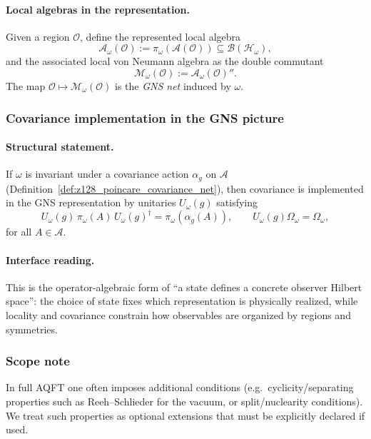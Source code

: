 \paragraph{Local algebras in the representation.}
Given a region $\mathcal{O}$, define the represented local algebra
\[
\mathcal{A}_\omega(\mathcal{O}) := \pi_\omega(\mathcal{A}(\mathcal{O})) \subseteq \mathcal{B}(\mathcal{H}_\omega),
\]
and the associated local von Neumann algebra as the double commutant
\[
\mathcal{M}_\omega(\mathcal{O}) := \mathcal{A}_\omega(\mathcal{O})''.
\]
The map $\mathcal{O}\mapsto \mathcal{M}_\omega(\mathcal{O})$ is the \emph{GNS net} induced by $\omega$.

\subsubsection{Covariance implementation in the GNS picture}
\paragraph{Structural statement.}
If $\omega$ is invariant under a covariance action $\alpha_g$ on $\mathcal{A}$ (Definition~\ref{def:z128_poincare_covariance_net}), then covariance is implemented in the GNS representation by unitaries $U_\omega(g)$ satisfying
\[
U_\omega(g)\,\pi_\omega(A)\,U_\omega(g)^\dagger=\pi_\omega(\alpha_g(A)),
\qquad
U_\omega(g)\Omega_\omega=\Omega_\omega,
\]
for all $A\in\mathcal{A}$.

\paragraph{Interface reading.}
\InterfaceTag This is the operator-algebraic form of ``a state defines a concrete observer Hilbert space'':
the choice of state fixes which representation is physically realized, while locality and covariance constrain how observables are organized by regions and symmetries.

\subsubsection{Scope note}
\AuditTag In full AQFT one often imposes additional conditions (e.g.\ cyclicity/separating properties such as Reeh--Schlieder for the vacuum, or split/nuclearity conditions).
We treat such properties as optional extensions that must be explicitly declared if used.
